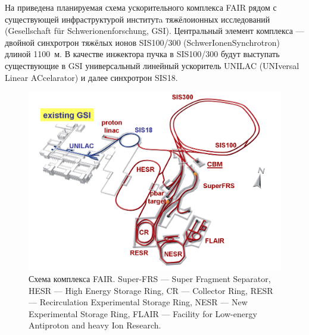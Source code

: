 На  приведена планируемая схема ускорительного комплекса FAIR рядом с существующей инфраструктурой институтa тяжёлоионных исследований (Gesellschaft f\"{u}r Schwerionenforschung, GSI).
Центральный элемент комплекса --- двойной синхротрон тяжёлых ионов SIS100/300 (SchwerIonenSynchrotron) длиной 1100~м. В качестве инжектора пучка в SIS100/300 будут выступать существующие в GSI универсальный линейный ускоритель UNILAC (UNIversal Linear ACcelarator) и далее синхротрон SIS18.

\begin{figure}[H]
\includegraphics[width=1.0\textwidth]{pictures/FAIR_structure.png}
\caption{Схема комплекса FAIR. Super-FRS --- Super Fragment Separator, HESR --- High Energy Storage Ring, CR --- Collector Ring, RESR --- Recirculation Experimental Storage Ring, NESR --- New Experimental Storage Ring, FLAIR --- Facility for Low-energy Antiproton and heavy Ion Research.}
\label{fig:FAIRstructure}
\end{figure}

